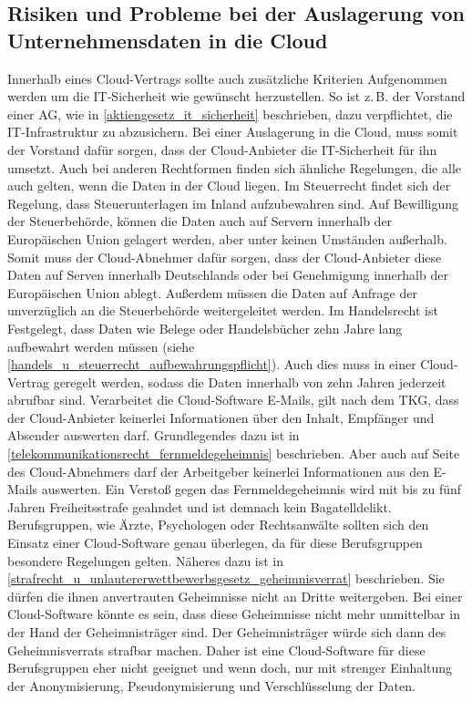  \subsection{Risiken und Probleme bei der Auslagerung von Unternehmensdaten in die Cloud}
Innerhalb eines {\glqq}Cloud-Vertrags{\grqq} sollte auch zus\"atzliche Kriterien Aufgenommen werden um die IT-Sicherheit wie gew\"unscht herzustellen. So ist z.\,B. der Vorstand einer AG, wie in \vref{aktiengesetz_it_sicherheit} beschrieben, dazu verpflichtet, die IT-Infrastruktur zu abzusichern. Bei einer Auslagerung in die Cloud, muss somit der Vorstand daf\"ur sorgen, dass der Cloud-Anbieter die IT-Sicherheit f\"ur ihn umsetzt. Auch bei anderen Rechtformen finden sich \"ahnliche Regelungen, die alle auch gelten, wenn die Daten in der Cloud liegen.\newline 
Im Steuerrecht findet sich der Regelung, dass Steuerunterlagen im Inland aufzubewahren sind. Auf Bewilligung der Steuerbeh\"orde, k\"onnen die Daten auch auf Servern innerhalb der Europ\"aischen Union gelagert werden, aber unter keinen Umst\"anden au{\ss}erhalb. Somit muss der Cloud-Abnehmer daf\"ur sorgen, dass der Cloud-Anbieter diese Daten auf Serven innerhalb Deutschlands oder bei Genehmigung innerhalb der Europ\"aischen Union ablegt. Au{\ss}erdem m\"ussen die Daten auf Anfrage der unverz\"uglich an die Steuerbeh\"orde weitergeleitet werden. Im Handelsrecht ist Festgelegt, dass Daten wie Belege oder Handelsb\"ucher zehn Jahre lang aufbewahrt werden m\"ussen (siehe \vref{handels_u_steuerrecht_aufbewahrungspflicht}). Auch dies muss in einer {\glqq}Cloud-Vertrag{\grqq} geregelt werden, sodass die Daten innerhalb von zehn Jahren jederzeit abrufbar sind.\newline
Verarbeitet die Cloud-Software E-Mails, gilt nach dem TKG, dass der Cloud-Anbieter keinerlei Informationen \"uber den Inhalt, Empf\"anger und Absender auswerten darf. Grundlegendes dazu ist in \vref{telekommunikationsrecht_fernmeldegeheimnis} beschrieben. Aber auch auf Seite des Cloud-Abnehmers darf der Arbeitgeber keinerlei Informationen aus den E-Mails auswerten. Ein Versto{\ss} gegen das Fernmeldegeheimnis wird mit bis zu f\"unf Jahren Freiheitsstrafe geahndet und ist demnach kein Bagatelldelikt.\newline 
Berufsgruppen, wie \"Arzte, Psychologen oder Rechtsanw\"alte sollten sich den Einsatz einer Cloud-Software genau \"uberlegen, da f\"ur diese Berufsgruppen besondere Regelungen gelten. N\"aheres dazu ist in \vref{strafrecht_u_unlautererwettbewerbsgesetz_geheimnisverrat} beschrieben. Sie d\"urfen die ihnen anvertrauten Geheimnisse nicht an Dritte weitergeben. Bei einer Cloud-Software k\"onnte es sein, dass diese Geheimnisse nicht mehr unmittelbar in der Hand der Geheimnistr\"ager sind. Der Geheimnistr\"ager w\"urde sich dann des Geheimnisverrats strafbar machen. Daher ist eine Cloud-Software f\"ur diese Berufsgruppen eher nicht geeignet und wenn doch, nur mit strenger Einhaltung der Anonymisierung, Pseudonymisierung und Verschl\"usselung der Daten.\newline
